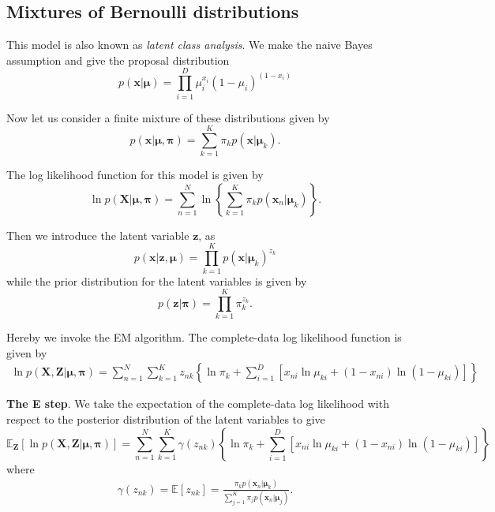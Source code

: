 \documentclass[a4paper]{book}
\renewcommand{\bf}{\mathbf}
\newcommand{\bb}{\mathbb}
\newcommand{\imp}[1]{\textit{#1}}
\newcommand{\bs}{\boldsymbol}
\begin{document}
\subsection{Mixtures of Bernoulli distributions}
This model is also known as \imp{latent class analysis}. We make the naive Bayes assumption and give the proposal distribution
\begin{equation}
	p(\bf{x}|\bs{\mu}) = \prod_{i=1}^D \mu_i^{x_i}(1-\mu_i)^{(1-x_i)}
\end{equation}

Now let us consider a finite mixture of these distributions given by
\begin{equation}
	p(\bf{x}|\bs{\mu,\pi}) = \sum_{k=1}^K \pi_k p(\bf{x}|\bs{\mu}_k).
\end{equation}

The log likelihood function for this model is given by
\begin{equation}
	\ln p(\bf{X}|\bs{\mu,\pi}) = \sum_{n=1}^N \ln \left\{ \sum_{k=1}^K \pi_k p(\bf{x}_n|\bs{\mu}_k) \right\}.
\end{equation}

Then we introduce the latent variable $\bf{z}$, as
\begin{equation}
	p(\bf{x|z},\bs{\mu}) = \prod_{k=1}^K p(\bf{x}|\bs{\mu}_k)^{z_k}
\end{equation}
while the prior distribution for the latent variables is given by
\begin{equation}
	p(\bf{z}|\bs{\pi}) = \prod_{k=1}^K \pi_k^{z_k}.
\end{equation}

Hereby we invoke the EM algorithm. The complete-data log likelihood function is given by
\begin{align}
	\ln p(\bf{X,Z}|\bs{\mu,\pi}) = \sum_{n=1}^{N} \sum_{k=1}^K z_{nk}  \left\{   \ln \pi_k 
	+ \sum_{i=1}^D [ x_{ni}\ln \mu_{ki}+(1-x_{ni})\ln(1-\mu_{ki}) ]  \right\} 
\end{align}

\textbf{The E step}. We take the expectation of the complete-data log likelihood with respect to the posterior distribution of the latent variables to give
\begin{equation}
	\bb{E}_{\bf{Z}}[\ln p(\bf{X,Z}|\bs{\mu,\pi})]=\sum_{n=1}^{N}\sum_{k=1}^K \gamma(z_{nk})\left\{\ln \pi_k + \sum_{i=1}^D [x_{ni}\ln \mu_{ki}+(1-x_{ni})\ln(1-\mu_{ki})] \right\}\label{BMME}
\end{equation}
where
\begin{align}
	\gamma(z_{nk}) =  \bb{E}[z_{nk}] = \frac{\pi_k p(\bf{x}_n|\bs{\mu}_k)}{\sum_{j=1}^K \pi_j p(\bf{x}_n|\bs{\mu}_j)}.
\end{align}
\end{document}
